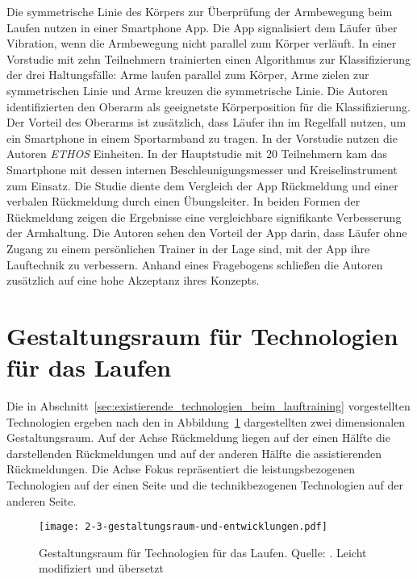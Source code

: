 Die symmetrische Linie des Körpers zur Überprüfung der Armbewegung beim Laufen nutzen \citet{Strohrmann2013, Strohrmann2014} in einer Smartphone App. Die App signalisiert dem Läufer über Vibration, wenn die Armbewegung nicht parallel zum Körper verläuft. In einer Vorstudie mit zehn Teilnehmern trainierten \citet{Strohrmann2013} einen Algorithmus zur Klassifizierung der drei Haltungsfälle: Arme laufen parallel zum Körper, Arme zielen zur symmetrischen Linie und Arme kreuzen die symmetrische Linie. Die Autoren identifizierten den Oberarm als geeignetste Körperposition für die Klassifizierung. Der Vorteil des Oberarms ist zusätzlich, dass Läufer ihn im Regelfall nutzen, um ein Smartphone in einem Sportarmband zu tragen. In der Vorstudie nutzen die Autoren \emph{ETHOS} Einheiten. In der Hauptstudie mit 20 Teilnehmern kam das Smartphone mit dessen internen Beschleunigungsmesser und Kreiselinstrument zum Einsatz. Die Studie diente dem Vergleich der App Rückmeldung und einer verbalen Rückmeldung durch einen Übungsleiter. In beiden Formen der Rückmeldung zeigen die Ergebnisse eine vergleichbare signifikante Verbesserung der Armhaltung. Die Autoren sehen den Vorteil der App darin, dass Läufer ohne Zugang zu einem persönlichen Trainer in der Lage sind, mit der App ihre Lauftechnik zu verbessern. Anhand eines Fragebogens schließen die Autoren zusätzlich auf eine hohe Akzeptanz ihres Konzepts.

\section{Gestaltungsraum für Technologien für das Laufen}
\label{sec:gestaltungsraum_fuer_technologien_fuer_das_laufen}
Die in Abschnitt~\ref{sec:existierende_technologien_beim_lauftraining} vorgestellten Technologien ergeben nach \citet[][]{Jensen2014} den in Abbildung~\ref{fig:2_3_gestaltungsraum_und_entwicklungen} dargestellten zwei dimensionalen Gestaltungsraum. Auf der Achse Rückmeldung liegen auf der einen Hälfte die darstellenden Rückmeldungen und auf der anderen Hälfte die assistierenden Rückmeldungen. Die Achse Fokus repräsentiert die leistungsbezogenen Technologien auf der einen Seite und die technikbezogenen Technologien auf der anderen Seite.

\begin{figure}[t]
	\centering
		\texttt{[image: 2-3-gestaltungsraum-und-entwicklungen.pdf]}
	\caption[Gestaltungsraum für Technologien für das Laufen]{Gestaltungsraum für Technologien für das Laufen. Quelle: \citet[][]{Jensen2014}. Leicht modifiziert und übersetzt}
	\label{fig:2_3_gestaltungsraum_und_entwicklungen}
\end{figure}

